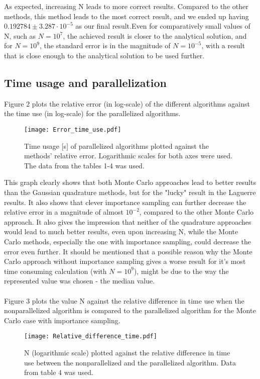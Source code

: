 \documentclass[10pt,a4paper]{article}
\begin{document}
As expected, increasing N leads to more correct results. Compared to the other methods, this method leads to the most correct result, and we ended up having $0.192784\pm 3.287\cdot10^{-5}$ as our final result.Even for comparatively small values of N, such as $N=10^7$, the achieved result is closer to the analytical solution, and for  $N=10^9$, the standard error is in the magnitude of $N=10^{-5}$, with a result that is close enough to the analytical solution to be used further.
\subsection{Time usage and parallelization}
Figure 2 plots the relative error (in log-scale) of the different algorithms against the time use (in log-scale) for the parallelized algorithms.
\begin{figure}[H]
\centering
\texttt{[image: Error\_time\_use.pdf]}
\caption[Time vs. relative error]{Time usage [s] of parallelized algorithms plotted against the methods' relative error. Logarithmic scales for both axes were used. The data from the tables 1-4 was used.}\label{Error_time_use}
\end{figure}
This graph clearly shows that both Monte Carlo approaches lead to better results than the Gaussian quadrature methods, but for the "lucky" result in the Laguerre results. It also shows that clever importance sampling can further decrease the relative error in a magnitude of almost $10^{-2}$, compared to the  other Monte Carlo approach. It also gives the impression that neither of the quadrature approaches would lead to much better results, even upon increasing N, while the Monte Carlo methods, especially the one with importance sampling, could decrease the error even further. It should be mentioned that a possible reason why the Monte Carlo approach without importance sampling gives a worse result for it's most time consuming calculation (with $N=10^9$), might be due to the way the represented value was chosen - the median value. \\\\
Figure 3 plots the value N against the relative difference in time use when the nonparallelized algorithm is compared to the parallelized algorithm for the Monte Carlo case with importance sampling.
\begin{figure}[H]
\centering
\texttt{[image: Relative\_difference\_time.pdf]}
\caption[N vs. relative time use]{N (logarithmic scale) plotted against the relative difference in time use between the nonparallelized and the parallelized algorithm. Data from table 4 was used.}\label{N vs. relative time use}
\end{figure}
\end{document}
